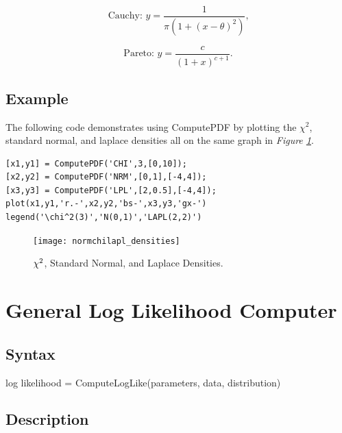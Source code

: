 \documentclass{book}
\newcommand{\textcode}[1]{\textsf{\small #1}}   %
\begin{document}
\begin{equation}
\text{Cauchy: }y=\frac{1}{\pi \left( 1+\left( x-\theta \right) ^{2}\right) }%
\text{,}  \label{eqn_caupdf}
\end{equation}

\begin{equation}
\text{Pareto:\ }y=\frac{c}{\left( 1+x\right) ^{c+1}}\text{.}
\label{eqn_parpdf}
\end{equation}

\subsection*{Example}

The following code demonstrates using \textcode{ComputePDF} by
plotting the $\chi ^{2}$, standard normal, and laplace densities all
on the same graph in \emph{Figure \ref{fig_densities}}.
\begin{verbatim}
[x1,y1] = ComputePDF('CHI',3,[0,10]);
[x2,y2] = ComputePDF('NRM',[0,1],[-4,4]);
[x3,y3] = ComputePDF('LPL',[2,0.5],[-4,4]);
plot(x1,y1,'r.-',x2,y2,'bs-',x3,y3,'gx-')
legend('\chi^2(3)','N(0,1)','LAPL(2,2)')
\end{verbatim}
\begin{figure}[htbp]
\begin{center}
\texttt{[image: normchilapl\_densities]}
\end{center}
\caption{$\protect\chi^2$, Standard Normal, and Laplace Densities.}
\label{fig_densities}
\end{figure}

\section{General Log Likelihood Computer}

\subsection*{Syntax}

\textcode{log likelihood = ComputeLogLike(parameters, data,
distribution)}

\subsection*{Description}
\end{document}
